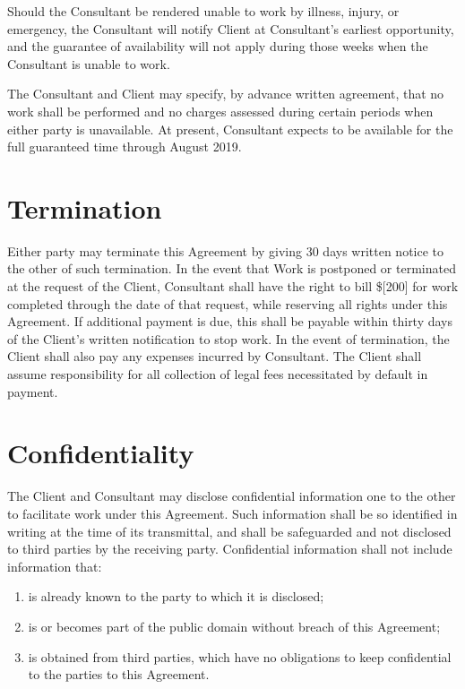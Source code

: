 \documentclass[10pt]{article}
\begin{document}
Should the Consultant be rendered unable to work by illness, injury, or
emergency, the Consultant will notify Client at Consultant's earliest
opportunity, and the guarantee of availability will not apply during those
weeks when the Consultant is unable to work.

The Consultant and Client may specify, by advance written agreement, that no
work shall be performed and no charges assessed during certain periods when
either party is unavailable.  At present, Consultant expects to be available
for the full guaranteed time through August 2019. 


\section{Termination}

Either party may terminate this Agreement by giving 30 days written notice
to the other of such termination. In the event that Work is postponed or
terminated at the request of the Client, Consultant shall have the right to
bill  \$[200]
for work completed through the date of that request, while
reserving all rights under this Agreement. If additional payment is due,
this shall be payable within thirty days of the Client's written
notification to stop work. In the event of termination, the Client shall
also pay any expenses incurred by Consultant.  The Client shall assume
responsibility for all collection of legal fees necessitated by default in
payment.




\section{Confidentiality}

The Client and Consultant may disclose confidential information one to the
other to facilitate work under this Agreement.  Such information shall be so
identified in writing at the time of its transmittal, and shall be
safeguarded and not disclosed to third parties by the receiving party.
Confidential information shall not include information that:

\begin{enumerate}
  \item is already known to the party to which it is disclosed; 
  \item is or becomes part of the public domain without breach of this Agreement;
  \item is obtained from third parties, which have no obligations to keep
    confidential to the parties to this Agreement. 
\end{enumerate}
\end{document}

